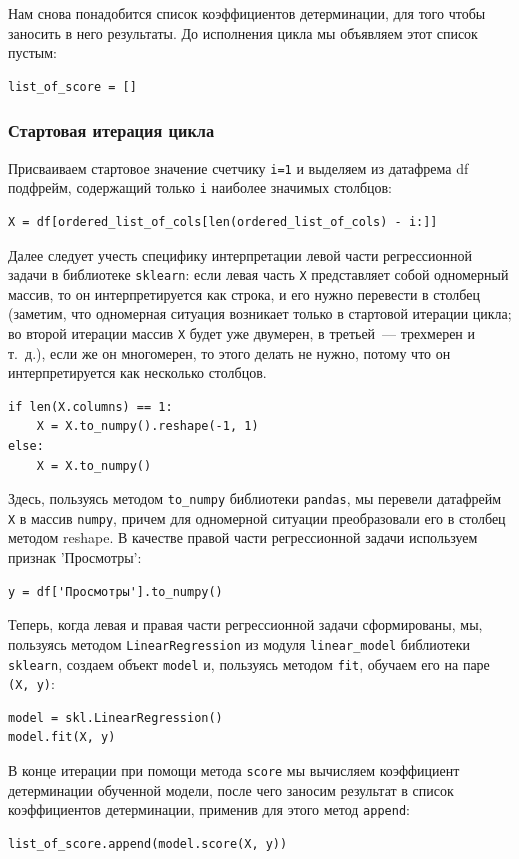\documentclass[a4paper,12pt]{article}
\begin{document}
Нам снова понадобится список коэффициентов детерминации, для того чтобы заносить в него результаты. До исполнения цикла мы объявляем этот список пустым:
\begin{verbatim}
list_of_score = []
\end{verbatim}


\subsubsection{Стартовая итерация цикла}

Присваиваем стартовое значение счетчику \texttt{i=1} и выделяем из датафрема df подфрейм, содержащий только \texttt{i} наиболее значимых столбцов:
\begin{verbatim}
X = df[ordered_list_of_cols[len(ordered_list_of_cols) - i:]]
\end{verbatim}
Далее следует учесть специфику интерпретации левой части регрессионной задачи в библиотеке \texttt{sklearn}: если левая часть \texttt{X} представляет собой одномерный массив, то он интерпретируется как строка, и его нужно перевести в столбец (заметим, что одномерная ситуация возникает только в стартовой итерации цикла; во второй итерации массив \texttt{X} будет уже двумерен, в третьей — трехмерен и т. д.), если же он многомерен, то этого делать не нужно, потому что он интерпретируется как несколько столбцов. 
\begin{verbatim}
if len(X.columns) == 1:
    X = X.to_numpy().reshape(-1, 1)
else:
    X = X.to_numpy()
\end{verbatim}
Здесь, пользуясь методом \texttt{to\_numpy} библиотеки \texttt{pandas}, мы перевели датафрейм \texttt{X} в массив \texttt{numpy}, причем для одномерной ситуации преобразовали его в столбец методом reshape.
В качестве правой части регрессионной задачи используем признак 'Просмотры':
\begin{verbatim}
y = df['Просмотры'].to_numpy()
\end{verbatim}
Теперь, когда левая и правая части регрессионной задачи сформированы, мы, пользуясь методом \texttt{LinearRegression} из модуля \texttt{linear\_model} библиотеки \texttt{sklearn}, создаем объект \texttt{model} и, пользуясь методом \texttt{fit}, обучаем его на паре \texttt{(X, y)}:
\begin{verbatim}
model = skl.LinearRegression()
model.fit(X, y)
\end{verbatim}
В конце итерации при помощи метода \texttt{score} мы вычисляем коэффициент детерминации обученной модели, после чего заносим результат в список коэффициентов детерминации, применив для этого метод \texttt{append}:
\begin{verbatim}
list_of_score.append(model.score(X, y))
\end{verbatim}
\end{document}
